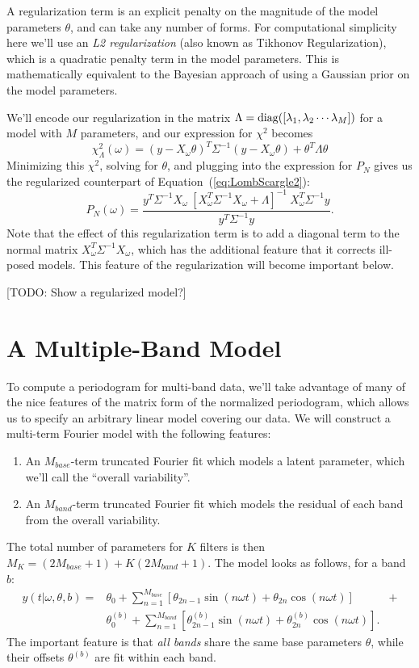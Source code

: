 \documentclass[12pt,preprint]{aastex}
\newcommand{\todo}[1]{{\color{red} [TODO: #1]}}
\newcommand{\Eq}[1]{Equation~(\ref{eq:#1})}
\newcommand{\eq}[1]{\Eq{#1}}
\newcommand{\eqlabel}[1]{\label{eq:#1}}
\begin{document}
A regularization term is an explicit penalty on the magnitude of the model parameters $\theta$, and can take any number of forms. For computational simplicity here we'll use an {\it L2 regularization} (also known as Tikhonov Regularization), which is a quadratic penalty term in the model parameters. This is mathematically equivalent to the Bayesian approach of using a Gaussian prior on the model parameters.

We'll encode our regularization in the matrix $\Lambda = {\rm diag}([\lambda_1, \lambda_2 \cdots \lambda_M])$ for a model with $M$ parameters, and our expression for $\chi^2$ becomes
\begin{equation}
  \eqlabel{chi2reg}
  \chi_\Lambda^2(\omega) = (y - X_\omega\theta)^T\Sigma^{-1}(y - X_\omega\theta) + \theta^T\Lambda\theta
\end{equation}
Minimizing this $\chi^2$, solving for $\theta$, and plugging into the expression for $P_N$ gives us the regularized counterpart of \eq{LombScargle2}:
\begin{equation}
  \eqlabel{LombScargleReg}
  P_N(\omega) = \frac{y^T\Sigma^{-1}X_\omega~[X_\omega^T\Sigma^{-1}X_\omega + \Lambda]^{-1}~X_\omega^T\Sigma^{-1}y}{y^T\Sigma^{-1}y}.
\end{equation}
Note that the effect of this regularization term is to add a diagonal term to the normal matrix $X_\omega^T\Sigma^{-1}X_\omega$, which has the additional feature that it corrects ill-posed models. This feature of the regularization will become important below.

\todo{Show a regularized model?}

\section{A Multiple-Band Model}

To compute a periodogram for multi-band data, we'll take advantage of many of the nice features of the matrix form of the normalized periodogram, which allows us to specify an arbitrary linear model covering our data. We will construct a multi-term Fourier model with the following features:
\begin{enumerate}
  \item An $M_{base}$-term truncated Fourier fit which models a latent parameter, which we'll call the ``overall variability''.
  \item An $M_{band}$-term truncated Fourier fit which models the residual of each band from the overall variability.
\end{enumerate}
The total number of parameters for $K$ filters is then $M_K = (2M_{base} + 1) + K(2M_{band} + 1)$. The model looks as follows, for a band $b$:
\begin{eqnarray}
  y(t|\omega,\theta,b) = &\theta_0 + \sum_{n=1}^{M_{base}} \left[\theta_{2n - 1}\sin(n\omega t) + \theta_{2n}\cos(n\omega t)\right]& +\\ 
  &\theta^{(b)}_0 + \sum_{n=1}^{M_{band}} \left[\theta^{(b)}_{2n - 1}\sin(n\omega t) + \theta^{(b)}_{2n}\cos(n\omega t)\right].&
\end{eqnarray}
The important feature is that {\it all bands} share the same base parameters $\theta$, while their offsets $\theta^{(b)}$ are fit within each band.
\end{document}
